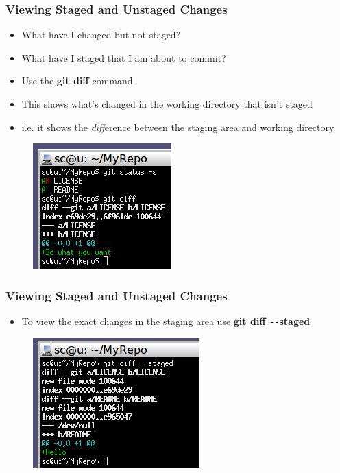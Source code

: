\documentclass{beamer}
\begin{document}
\begin{frame}
	\frametitle{Viewing Staged and Unstaged Changes}
	\begin{itemize}
		\item{What have I changed but not staged?}
		\item{What have I staged that I am about to commit?}
		\item{Use the \textbf{git diff} command}
		\item{This shows what's changed in the working directory that isn't staged}
		\item{i.e. it shows the \textit{diff}erence between the staging area and working directory}
	\end{itemize}
	\begin{figure}
		\includegraphics[scale=0.62]{Viewing_Staged_and_Unstaged_Changes-0.png}
	\end{figure}
\end{frame}

\begin{frame}
	\frametitle{Viewing Staged and Unstaged Changes}
	\begin{itemize}
		\item{To view the exact changes in the staging area use \textbf{git diff \texttt{-{}-}staged}}
	\end{itemize}
	\begin{figure}
		\includegraphics[scale=0.62]{Viewing_Staged_and_Unstaged_Changes-1.png}
	\end{figure}
\end{frame}
\end{document}
